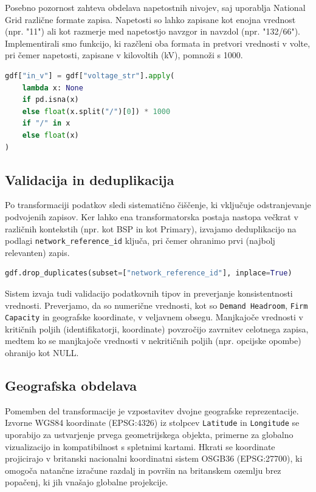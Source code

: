 \documentclass[a4paper,12pt,openright]{book}
\begin{document}
Posebno pozornost zahteva obdelava napetostnih nivojev, saj uporablja National Grid različne formate zapisa. Napetosti so lahko zapisane kot enojna vrednost (npr. "11") ali kot razmerje med napetostjo navzgor in navzdol (npr. "132/66"). Implementirali smo funkcijo, ki razčleni oba formata in pretvori vrednosti v volte, pri čemer napetosti, zapisane v kilovoltih (kV), pomnoži s 1000.

\begin{lstlisting}[language=Python, caption={Razčlenjevanje napetostnih nivojev}, captionpos=b, label={lst:voltage_parsing}]
gdf["in_v"] = gdf["voltage_str"].apply(
    lambda x: None
    if pd.isna(x)
    else float(x.split("/")[0]) * 1000
    if "/" in x
    else float(x)
)
\end{lstlisting}

\subsection{Validacija in deduplikacija}

Po transformaciji podatkov sledi sistematično čiščenje, ki vključuje odstranjevanje podvojenih zapisov. Ker lahko ena transformatorska postaja nastopa večkrat v različnih kontekstih (npr. kot BSP in kot Primary), izvajamo deduplikacijo na podlagi \texttt{network\_reference\_id} ključa, pri čemer ohranimo prvi (najbolj relevanten) zapis.

\begin{lstlisting}[language=Python, caption={Odstranjevanje duplikatov}, captionpos=b, label={lst:deduplication}]
gdf.drop_duplicates(subset=["network_reference_id"], inplace=True)
\end{lstlisting}

Sistem izvaja tudi validacijo podatkovnih tipov in preverjanje konsistentnosti vrednosti. Preverjamo, da so numerične vrednosti, kot so \texttt{Demand Headroom}, \texttt{Firm Capacity} in geografske koordinate, v veljavnem obsegu. Manjkajoče vrednosti v kritičnih poljih (identifikatorji, koordinate) povzročijo zavrnitev celotnega zapisa, medtem ko se manjkajoče vrednosti v nekritičnih poljih (npr. opcijske opombe) ohranijo kot NULL.

\subsection{Geografska obdelava}

Pomemben del transformacije je vzpostavitev dvojne geografske reprezentacije. Izvorne WGS84 koordinate (EPSG:4326) iz stolpcev \texttt{Latitude} in \texttt{Longitude} se uporabijo za ustvarjenje prvega geometrijskega objekta, primerne za globalno vizualizacijo in kompatibilnost s spletnimi kartami. Hkrati se koordinate projicirajo v britanski nacionalni koordinatni sistem OSGB36 (EPSG:27700), ki omogoča natančne izračune razdalj in površin na britanskem ozemlju brez popačenj, ki jih vnašajo globalne projekcije.
\end{document}

